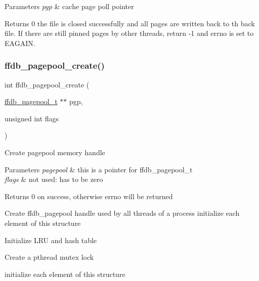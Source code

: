 \begin{DoxyParams}{Parameters}
{\em pgp} & cache page poll pointer \\
\hline
\end{DoxyParams}
\begin{DoxyReturn}{Returns}
0 the file is closed successfully and all pages are written back to th back file. If there are still pinned pages by other threads, return -\/1 and errno is set to E\+A\+G\+A\+IN. 
\end{DoxyReturn}
\mbox{\label{adat-devel_2other__libs_2filedb_2filehash_2ffdb__pagepool_8h_a942bc04bad183d386b22a85d5d070ffc}} 
\subsubsection{\texorpdfstring{ffdb\_pagepool\_create()}{ffdb\_pagepool\_create()}}
{\footnotesize\ttfamily int ffdb\+\_\+pagepool\+\_\+create (\begin{DoxyParamCaption}\item[{\mbox{\hyperlink{adat-devel_2other__libs_2filedb_2filehash_2ffdb__pagepool_8h_a73290f737b0e5f8be90a0fa96ddf6ab6}{ffdb\+\_\+pagepool\+\_\+t}} $\ast$$\ast$}]{pgp,  }\item[{unsigned int}]{flags }\end{DoxyParamCaption})}

Create pagepool memory handle


\begin{DoxyParams}{Parameters}
{\em pagepool} & this is a pointer for ffdb\+\_\+pagepool\+\_\+t \\
\hline
{\em flags} & not used\+: has to be zero \\
\hline
\end{DoxyParams}
\begin{DoxyReturn}{Returns}
0 on success, otherwise errno will be returned
\end{DoxyReturn}
Create ffdb\+\_\+pagepool handle used by all threads of a process initialize each element of this structure

Initialize L\+RU and hash table

Create a pthread mutex lock

initialize each element of this structure

